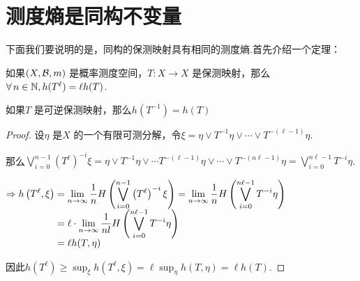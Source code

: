 \section{测度熵是同构不变量}
下面我们要说明的是，同构的保测映射具有相同的测度熵.首先介绍一个定理：
\begin{theorem}{}
    如果$(X,\mathcal{B},m)$ 是概率测度空间，$T:X\to X$ 是保测映射，那么$\forall\, n\in\mathbb{N},h(T^\ell)=\ell h(T)$.\par
    如果$T$ 是可逆保测映射，那么$h(T^{-1})=h(T)$
\end{theorem}
\begin{proof}
    设$\eta$ 是$X$ 的一个有限可测分解，令$\xi=\eta\vee T^{-1}\eta\vee \cdots\vee T^{-(\ell-1)}\eta$.\par
    那么$\bigvee_{i=0}^{n-1}\left(T^\ell\right)^{-i}\xi=\eta\vee T^{-1}\eta\vee\cdots T^{-(\ell-1)}\eta\vee\cdots\vee T^{-(n\ell-1)}\eta=\bigvee_{i=0}^{n\ell-1}{T^{-i}\eta}$.\par
    $\Rightarrow \setjot[-2]\begin{aligned}[t]
        h \left(T^{\ell},\xi\right)&=\lim_{n\to\infty}{\frac{1}{n}H \left(\bigvee_{i=0}^{n-1}\left(T^\ell\right)^{-i}\xi\right)} =\lim_{n\to\infty}{\frac{1}{n}H \left(\bigvee_{i=0}^{n\ell-1}T^{-i}\eta\right)}\\
        &=\ell\cdot\lim_{n\to\infty}{\frac{1}{nl}H \left(\bigvee_{i=0}^{n\ell-1}{T^{-i}\eta}\right)} \\
        &=\ell h(T,\eta)
    \end{aligned} $\par
    因此$h \left(T^\ell\right)\geq\sup_{\xi}{h \left(T^\ell,\xi\right)}=\ell \sup_{\eta}{h(T,\eta)}=\ell h(T)$.\par
    

\end{proof}
